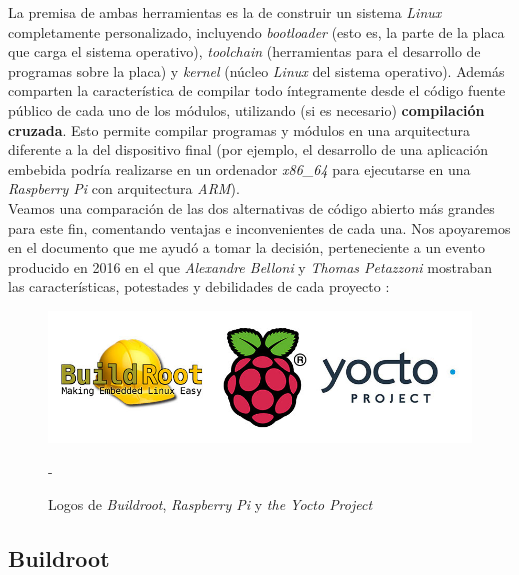 La premisa de ambas herramientas es la de construir un sistema \textit{Linux} completamente personalizado, incluyendo \textit{bootloader} (esto es, la parte de la placa que carga el sistema operativo), \textit{toolchain} (herramientas para el desarrollo de programas sobre la placa) y \textit{kernel} (núcleo \textit{Linux} del sistema operativo). Además comparten la característica de compilar todo íntegramente desde el código fuente público de cada uno de los módulos, utilizando (si es necesario) \textbf{compilación cruzada}. Esto permite compilar programas y módulos en una arquitectura diferente a la del dispositivo final (por ejemplo, el desarrollo de una aplicación embebida podría realizarse en un ordenador \textit{x86\_64} para ejecutarse en una \textit{Raspberry Pi} con arquitectura \textit{ARM}).\\

Veamos una comparación de las dos alternativas de código abierto más grandes para este fin, comentando ventajas e inconvenientes de cada una. Nos apoyaremos en el documento que me ayudó a tomar la decisión, perteneciente a un evento producido en 2016 en el que \textit{Alexandre Belloni} y \textit{Thomas Petazzoni} mostraban las características, potestades y debilidades de cada proyecto \cite{yocto-vs-buildroot-event}:

\begin{figure}[H]
	\centering
	\includegraphics[width=0.6\linewidth]{imagenes/buildroot_rpi_yocto_logos.jpg}
	\caption{Logos de \textit{Buildroot},\textit{ Raspberry Pi} y \textit{the Yocto Project}} - \cite{imagen-buildroot-rpi-yocto}
	\label{rpi-buildroot-vs-yocto}
\end{figure}

\subsection{Buildroot}

